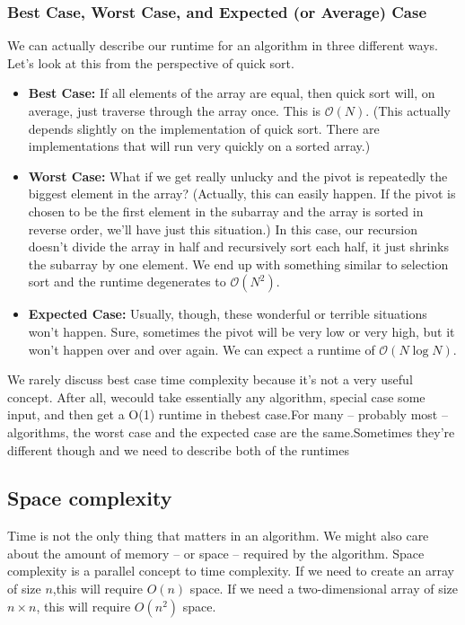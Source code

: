 \documentclass{report}
\begin{document}
    \bigbreak \noindent 
    \subsubsection{Best Case, Worst Case, and Expected (or Average) Case}
    \bigbreak \noindent 
    We can actually describe our runtime for an algorithm in three different ways. Let’s look at this from the perspective of quick sort.
    \begin{itemize}
        \item \textbf{Best Case:} If all elements of the array are equal, then quick sort will, on average, just traverse through the array once. This is $\mathcal{O}(N)$. (This actually depends slightly on the implementation of quick sort. There are implementations that will run very quickly on a sorted array.)
        \item \textbf{Worst Case:} What if we get really unlucky and the pivot is repeatedly the biggest element in the array? (Actually, this can easily happen. If the pivot is chosen to be the first element in the subarray and the array is sorted in reverse order, we’ll have just this situation.) In this case, our recursion doesn’t divide the array in half and recursively sort each half, it just shrinks the subarray by one element. We end up with something similar to selection sort and the runtime degenerates to $\mathcal{O}(N^2)$.
        \item \textbf{Expected Case:} Usually, though, these wonderful or terrible situations won’t happen. Sure, sometimes the pivot will be very low or very high, but it won’t happen over and over again. We can expect a runtime of $\mathcal{O}(N \log N)$.
    \end{itemize}
    \bigbreak \noindent 
    We rarely discuss best case time complexity because it’s not a very useful concept. After all, wecould take essentially any algorithm, special case some input, and then get a O(1) runtime in thebest case.For many – probably most – algorithms, the worst case and the expected case are the same.Sometimes they’re different though and we need to describe both of the runtimes

    \bigbreak \noindent 
    \subsection{Space complexity}
    \bigbreak \noindent 
    Time is not the only thing that matters in an algorithm. We might also care about the amount of memory – or space – required by the algorithm. Space complexity is a parallel concept to time complexity. If we need to create an array of size $n$,this will require $O(n)$ space. If we need a two-dimensional array of size $n \times n$, this will require $O(n^{2})$ space.
    \bigbreak \noindent 
\end{document}
